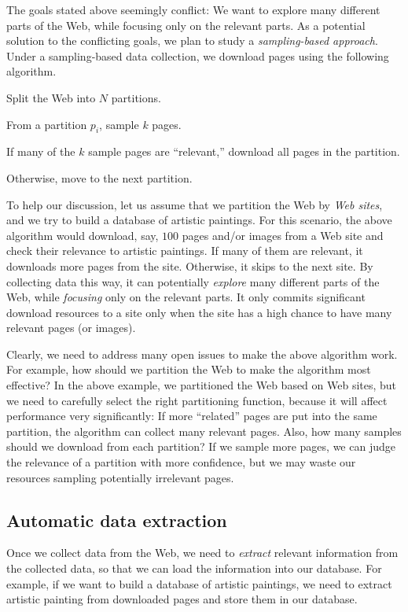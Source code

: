 The goals stated above seemingly conflict: We want to explore
many different parts of the Web, while focusing only on
the relevant parts. As a potential solution
to the conflicting goals, we plan to study a {\em sampling-based approach}.
Under a sampling-based data collection, we download
pages using the following algorithm.

\begin{tightenumerate}
\item Split the Web into $N$ partitions.
\item From a partition $p_i$, sample $k$ pages.
\item If many of the $k$ sample pages are ``relevant,''
      download all pages in the partition.
\item Otherwise, move to the next partition.
\end{tightenumerate}

To help our discussion, let us assume that we partition the Web
by {\em Web sites}, and we try to build a database of artistic paintings.
For this scenario, the above algorithm would download, say, $100$ 
pages and/or images from a Web site and check their relevance 
to artistic paintings. If many of them are relevant, it downloads more pages 
from the site. Otherwise, it skips
to the next site. By collecting data this way, it can
potentially {\em explore} many different parts of the Web,
while {\em focusing} only on the relevant parts. It only commits
significant download resources to a site only when the site has
a high chance to have many relevant pages (or images).

Clearly, we need to address many open issues 
to make the above algorithm work. For example, how
should we partition the Web to make the algorithm most effective?
In the above example, we partitioned the Web based on Web sites,
but we need to carefully select the right partitioning function,
because it will affect performance very significantly:
If more ``related'' pages are put into the same partition, the
algorithm can collect many relevant pages. 
Also, how many samples should we
download from each partition? If we sample more pages, we can
judge the relevance of a partition with more confidence, but
we may waste our resources sampling potentially irrelevant pages.

\subsection{Automatic data extraction}
Once we collect data from the Web, we need to {\em extract}
relevant information from the collected data,
so that we can load the information into our database.
For example, if we want to build a database of artistic paintings,
we need to extract artistic painting from downloaded pages 
and store them in our database.

